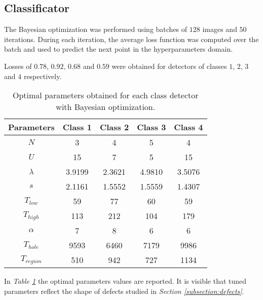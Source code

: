     \subsection{Classificator}
    \par{
    	The Bayesian optimization was performed using batches of $128$ images and $50$ iterations. During each iteration, the average loss function was computed over the batch and used to predict the next point in the hyperparameters domain.
    }	
   	\par{
    	Losses of $0.78$, $0.92$, $0.68$ and $0.59$ were obtained for detectors of classes $1$, $2$, $3$ and $4$ respectively.
    }
    \begin{table}
		\centering
		\begin{tabular}{|c|c|c|c|c|}
			\hline
			\textbf{Parameters} & \textbf{Class 1} & \textbf{Class 2} & \textbf{Class 3} & \textbf{Class 4}\\ \hline
			$N$ & 3 & 4 & 5 & 4 \\ \hline
			$U$ & 15 & 7 & 5 & 15 \\ \hline
			$\lambda$ & 3.9199 & 2.3621 & 4.9810 & 3.5076 \\ \hline
			$s$ & 2.1161 & 1.5552 & 1.5559 & 1.4307 \\ \hline
			$T_{low}$ & 59 & 77 & 60 & 59 \\ \hline
			$T_{high}$ & 113 & 212 & 104 & 179 \\ \hline
			$\alpha$ & 7 & 8 & 6 & 6 \\ \hline
			$T_{hole}$ & 9593 & 6460 & 7179 & 9986 \\ \hline
			$T_{region}$ & 510 & 942 & 727 & 1134 \\ \hline
		\end{tabular}
		\vspace{0.25cm}
		\caption{Optimal parameters obtained for each class detector with Bayesian optimization.}
		\label{table:params-bayesopt}
	\end{table}
	\par{
		In \emph{Table \ref{table:params-bayesopt}} the optimal parameters values are reported. It is visible that tuned parameters reflect the shape of defects studied in \emph{Section \ref{subsection:defects}}.
	}	
